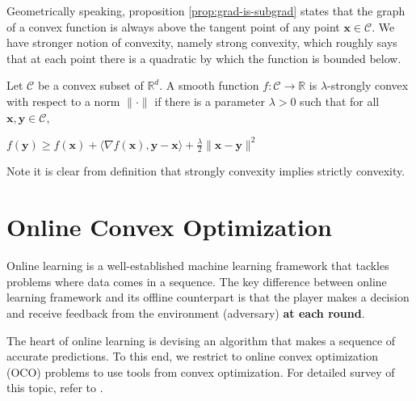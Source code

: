\documentclass[12pt, a4paper]{report}
\begin{document}
Geometrically speaking, proposition \ref{prop:grad-is-subgrad} states that the graph of a convex function is always above the tangent point of any point $\mathbf{x} \in \mathcal{C}$. We have stronger notion of convexity, namely strong convexity, which roughly says that at each point there is a quadratic by which the function is bounded below. 
\begin{defn}
Let $\mathcal{C}$ be a convex subset of $\mathbb{R}^d$. A smooth function $f : \mathcal{C} \rightarrow \mathbb{R}$ is $\lambda$-strongly convex with respect to a norm $\lVert \cdot \rVert$ if there is a parameter $\lambda > 0$ such that for all $\mathbf{x}, \mathbf{y} \in \mathcal{C}$, 
\begin{center}
    $\displaystyle f(\mathbf{y}) \geq f(\mathbf{x}) + \langle \nabla f(\mathbf{x}), \mathbf{y} - \mathbf{x} \rangle + \frac{\lambda}{2}\lVert \mathbf{x} - \mathbf{y} \rVert^2$
\end{center}
\end{defn}
Note it is clear from definition that strongly convexity implies strictly convexity.

\section{Online Convex Optimization}
Online learning is a well-established machine learning framework that tackles problems where data comes in a sequence. 
The key difference between online learning framework and its offline counterpart is that the player makes a decision and receive feedback from the environment (adversary) \textbf{at each round}.

The heart of online learning is devising an algorithm that makes a sequence of accurate predictions. To this end, we restrict to online convex optimization (OCO) problems to use tools from convex optimization. For detailed survey of this topic, refer to \cite{Orabona2019OnlineLearning, ShalevShwartz2007OnlineLT}.
\end{document}
